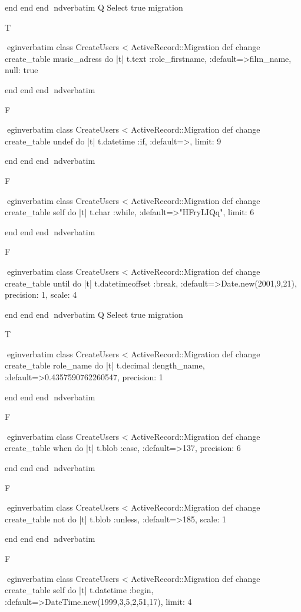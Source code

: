     end 
  end 
end
nd{verbatim}
Q
 Select true migration

T

egin{verbatim}
 class CreateUsers < ActiveRecord::Migration 
  def change 
    create_table music_adress do |t| 
      t.text :role_firstname, :default=>film_name, null: true
    
    end 
  end 
end
nd{verbatim}

F

egin{verbatim}
 class CreateUsers < ActiveRecord::Migration 
  def change 
    create_table undef do |t| 
      t.datetime :if, :default=>, limit: 9
    
    end 
  end 
end
nd{verbatim}

F

egin{verbatim}
 class CreateUsers < ActiveRecord::Migration 
  def change 
    create_table self do |t| 
      t.char :while, :default=>"HFryLIQq", limit: 6
    
    end 
  end 
end
nd{verbatim}

F

egin{verbatim}
 class CreateUsers < ActiveRecord::Migration 
  def change 
    create_table until do |t| 
      t.datetimeoffset :break, :default=>Date.new(2001,9,21), precision: 1, scale: 4
    
    end 
  end 
end
nd{verbatim}
Q
 Select true migration

T

egin{verbatim}
 class CreateUsers < ActiveRecord::Migration 
  def change 
    create_table role_name do |t| 
      t.decimal :length_name, :default=>0.4357590762260547, precision: 1
    
    end 
  end 
end
nd{verbatim}

F

egin{verbatim}
 class CreateUsers < ActiveRecord::Migration 
  def change 
    create_table when do |t| 
      t.blob :case, :default=>137, precision: 6
    
    end 
  end 
end
nd{verbatim}

F

egin{verbatim}
 class CreateUsers < ActiveRecord::Migration 
  def change 
    create_table not do |t| 
      t.blob :unless, :default=>185, scale: 1
    
    end 
  end 
end
nd{verbatim}

F

egin{verbatim}
 class CreateUsers < ActiveRecord::Migration 
  def change 
    create_table self do |t| 
      t.datetime :begin, :default=>DateTime.new(1999,3,5,2,51,17), limit: 4
    

